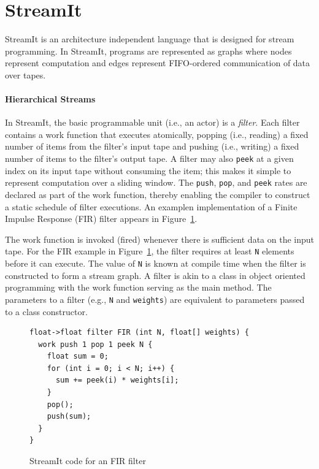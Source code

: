 \section{StreamIt}
\label{sec:streamit}

StreamIt  is   an  architecture independent language that is
designed for  stream programming. In StreamIt, programs are
represented as graphs where  nodes represent  computation and edges
represent FIFO-ordered communication of data over tapes.

\paragraph*{Hierarchical Streams}
In  StreamIt, the  basic programmable  unit (i.e., an actor) is a {\it
filter}.   Each filter contains  a work  function that executes
atomically,  popping (i.e., reading)  a fixed number  of items  from
the  filter's input  tape and pushing (i.e., writing) a fixed number
of items to the filter's output tape.  A filter  may also {\tt peek} at
a given index  on its input tape without  consuming  the  item;  this
makes  it  simple  to  represent computation over a
sliding window.   The {\tt push}, {\tt pop}, and {\tt peek} rates are
declared as part  of  the work  function,  thereby enabling  the
compiler  to construct a static schedule of filter executions. An examplen
implementation of a Finite Impulse Response (FIR) filter appears in Figure~\ref{fig:fir}.

The work function is invoked (fired) whenever there is sufficient data
on the input tape. For the FIR example in Figure~\ref{fig:fir}, the filter requires at least
\texttt{N} elements before it can execute. The value of \texttt{N} is
known at compile time when the filter is constructed to form a stream
graph. A filter is akin to a class in object oriented programming
with the work function serving as the main method. The parameters
to a filter (e.g., \texttt{N} and \texttt{weights}) are equivalent to
parameters passed to a class constructor. 

\begin{figure}[t]
\begin{scriptsize}
\begin{verbatim}
float->float filter FIR (int N, float[] weights) {
  work push 1 pop 1 peek N {
    float sum = 0;
    for (int i = 0; i < N; i++) {
      sum += peek(i) * weights[i];
    }
    pop();
    push(sum);
  }
}
\end{verbatim}
\end{scriptsize}
\vspace{-3pt}
\caption{StreamIt code for an FIR filter\label{fig:fir}}
\end{figure}

